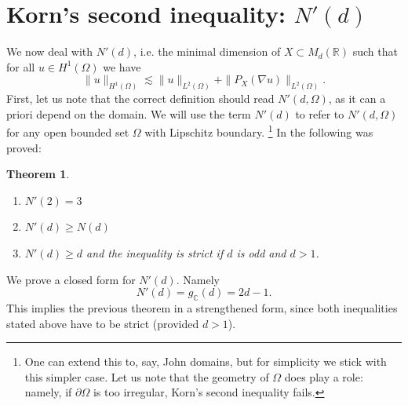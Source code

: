 \documentclass[11pt, a4paper, reqno]{elsarticle}
\newtheorem{theorem}{Theorem}[section]
\theoremstyle{definition}
\theoremstyle{remark}
\begin{document}
\section{Korn's second inequality:
\texorpdfstring{$N'(d)$}{N'(d)}}\label{sec : second}
We now deal with $N'(d)$, i.e. the minimal dimension of
$X\subset M_d(\mathbb{R})$ such that for all
$u\in H^1(\Omega)$ we have
\begin{equation*}
	\|u\|_{H^1(\Omega)}
\lesssim
	\|u\|_{L^2(\Omega)}
+
	\|P_X(\nabla u)\|_{L^2(\Omega)}.
\end{equation*}
First, let us note that the correct definition should read 
$N'(d,\Omega)$, as it can a priori depend on the domain. 
We will use the term $N'(d)$ to refer to $N'(d,\Omega)$
for any open bounded set $\Omega$ with Lipschitz boundary.
\footnote{
	One can extend this to, say, John domains, 
	but for simplicity we stick with this simpler case.
	Let us note that the geometry of $\Omega$ does play a role:
	namely, if $\partial \Omega$ is too irregular, 
	Korn's second inequality fails.
}
In \cite{Chipot2021OnType} the following
was proved:
\begin{theorem}
    \begin{enumerate}
        \item $N'(2)=3$
        \item $N'(d)\ge N(d)$
        \item $N'(d)\ge d$ and the inequality is strict if $d$ is odd and $d>1$.
    \end{enumerate}
\end{theorem}
We prove a closed form for $N'(d).$ Namely
\begin{equation*}
    N'(d)
=
	g_{\mathbb C}(d)
=
	2d-1.
\end{equation*}
This implies the previous theorem in a strengthened form,
since both inequalities stated above
have to be strict (provided $d>1$).
\end{document}
